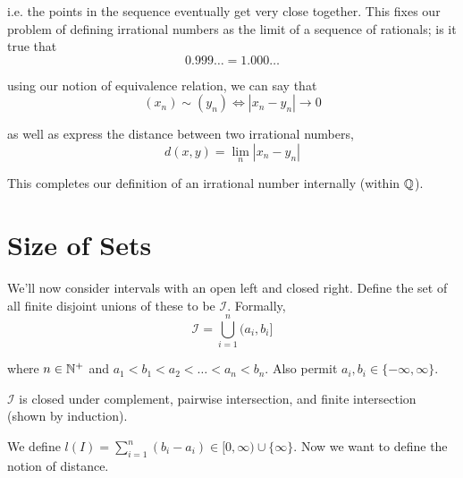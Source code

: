 \documentclass[11pt]{article}
\begin{document}
i.e. the points in the sequence eventually get very close together. This fixes our problem of defining irrational numbers as the limit of a sequence of rationals; is it true that
\[0.999\ldots = 1.000\ldots\]

using our notion of equivalence relation, we can say that
\[(x_n) \sim (y_n) \iff |x_n - y_n| \to 0\]

as well as express the distance between two irrational numbers,
\[d(x, y) = \lim_n|x_n - y_n|\]

This completes our definition of an irrational number internally (within $\mathbb{Q}$).

\section{Size of Sets}

We'll now consider intervals with an open left and closed right. Define the set of all finite disjoint unions of these to be $\mathcal{I}$. Formally,
\[\mathcal{I} = \bigcup_{i=1}^n (a_i, b_i]\]

where $n \in \mathbb{N}^+$ and $a_1 < b_1 < a_2 < \ldots < a_n < b_n$. Also permit $a_i, b_i \in \{-\infty, \infty\}$.

$\mathcal{I}$ is closed under complement, pairwise intersection, and finite intersection (shown by induction).

We define $l(I) = \sum_{i=1}^n (b_i - a_i) \in [0, \infty) \cup \{\infty\}$. Now we want to define the notion of distance.
\end{document}
